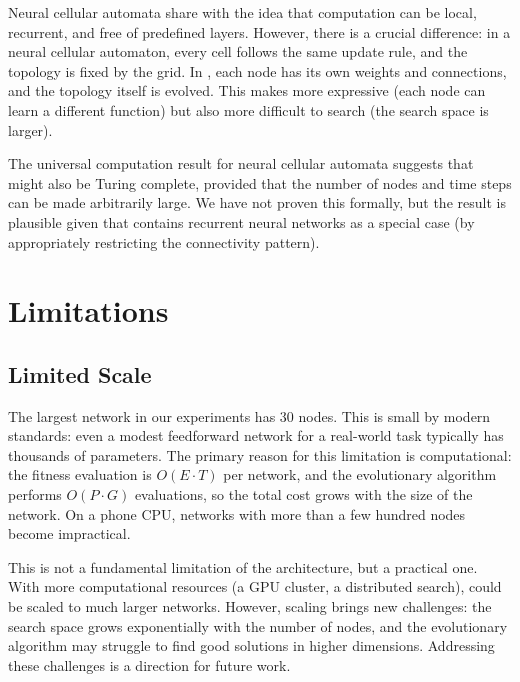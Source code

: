 Neural cellular automata \citep{mordvintsev2020growing} share with
\modnet{} the idea that computation can be local, recurrent, and free
of predefined layers. However, there is a crucial difference: in a
neural cellular automaton, every cell follows the same update rule,
and the topology is fixed by the grid. In \modnet{}, each node has
its own weights and connections, and the topology itself is evolved.
This makes \modnet{} more expressive (each node can learn a different
function) but also more difficult to search (the search space is
larger).

The universal computation result for neural cellular automata
\citep{bena2025path} suggests that \modnet{} might also be Turing
complete, provided that the number of nodes and time steps can be
made arbitrarily large. We have not proven this formally, but the
result is plausible given that \modnet{} contains recurrent neural
networks as a special case (by appropriately restricting the
connectivity pattern).

\section{Limitations}
\label{sec:limitations}

\subsection{Limited Scale}
\label{sec:limitation-scale}

The largest network in our experiments has 30 nodes. This is small by
modern standards: even a modest feedforward network for a real-world
task typically has thousands of parameters. The primary reason for
this limitation is computational: the fitness evaluation is
$O(E \cdot T)$ per network, and the evolutionary algorithm performs
$O(P \cdot G)$ evaluations, so the total cost grows with the size of
the network. On a phone CPU, networks with more than a few hundred
nodes become impractical.

This is not a fundamental limitation of the architecture, but a
practical one. With more computational resources (a GPU cluster, a
distributed search), \modnet{} could be scaled to much larger
networks. However, scaling brings new challenges: the search space
grows exponentially with the number of nodes, and the evolutionary
algorithm may struggle to find good solutions in higher dimensions.
Addressing these challenges is a direction for future work.


